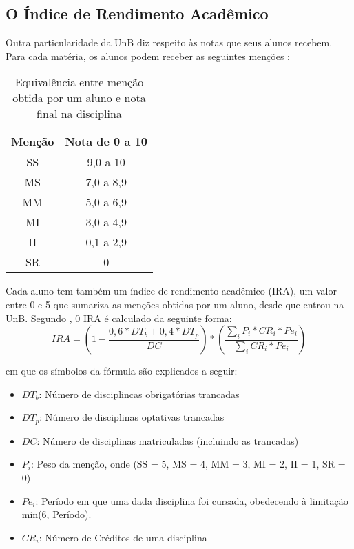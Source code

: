 \subsection{O Índice de Rendimento Acadêmico}
Outra particularidade da UnB diz respeito às notas que seus alunos recebem. Para cada
matéria, os alunos podem receber as seguintes menções \cite{manual_calouro}: 

\begin{table}
\begin{center}
\begin{tabular}[c]{|c|c|}
    \hline
    \textbf{Menção} & \textbf{Nota de 0 a 10} \\
    \hline
    SS & 9,0 a 10 \\
    \hline
    MS & 7,0 a 8,9 \\
    \hline
    MM & 5,0 a 6,9 \\
    \hline
    MI & 3,0 a 4,9 \\
    \hline
    II & 0,1 a 2,9 \\
    \hline
    SR & 0 \\
    \hline
\end{tabular}
\end{center}
\caption{Equivalência entre menção obtida por um aluno e nota final na disciplina}
\end{table}

Cada aluno tem também um índice de rendimento acadêmico (IRA), um valor entre 0 e 5
que sumariza as menções obtidas por um aluno, desde que entrou na UnB. Segundo
\cite{manual_calouro}, 0 IRA é calculado da seguinte forma:  
\begin{equation}
    IRA = (1 - \frac{0,6 * DT_b + 0,4 * DT_p}{DC}) * 
    (\frac{\sum_{i}P_i * CR_i * Pe_i}{\sum_{i} CR_i * Pe_i})
\end{equation}

em que os símbolos da fórmula são explicados a seguir: 
\begin{itemize}
    \item $DT_b$: Número de disciplincas obrigatórias trancadas
    \item $DT_p$: Número de disciplinas optativas trancadas
    \item $DC$: Número de disciplinas matriculadas (incluindo as trancadas)
    \item $P_i$: Peso da menção, onde (SS = 5, MS = 4, MM = 3, MI = 2, II = 1, SR =
        0)
    \item $Pe_i$: Período em que uma dada disciplina foi cursada, obedecendo à
        limitação min(6, Período). 
    \item $CR_i$: Número de Créditos de uma disciplina
\end{itemize}

